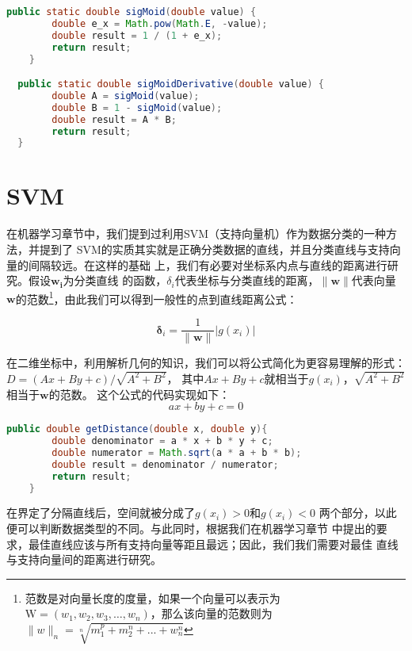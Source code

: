 \begin{lstlisting}[language=Java]
	public static double sigMoid(double value) {
		double e_x = Math.pow(Math.E, -value);
		double result = 1 / (1 + e_x);
		return result;
	}

  public static double sigMoidDerivative(double value) {
		double A = sigMoid(value);
		double B = 1 - sigMoid(value);
		double result = A * B;
		return result;
  }
\end{lstlisting}


\section{SVM}
在机器学习章节中，我们提到过利用SVM（支持向量机）作为数据分类的一种方法，并提到了
SVM的实质其实就是正确分类数据的直线，并且分类直线与支持向量的间隔较远。在这样的基础
上，我们有必要对坐标系内点与直线的距离进行研究。假设$\mathbf{w_{i}}$为分类直线
的函数，$\delta_{i}$代表坐标与分类直线的距离，$\mathbf{\|\mathbf{w}\|}$代表向量
$\mathbf{w}$的范数\footnote{范数是对向量长度的度量，如果一个向量可以表示为
$\mathrm{W}=(w_1, w_2, w_3, \ldots ,w_n)$，那么该向量的范数则为
$\|w\|_{n}=\sqrt[n]{m_{1}^{p}+m_{2}^{n}+...+w_{n}^{n}}$}，由此我们可以得到一般性的点到直线距离公式：

\begin{equation}
	\boldsymbol{\delta}_{i}=\frac{1}{\|\mathbf{w}\|}\left|g\left(x_{i}\right)\right|
\end{equation}

在二维坐标中，利用解析几何的知识，我们可以将公式简化为更容易理解的形式：
$D=(Ax+By+c) / \sqrt{A^{2}+B^{2}}$，
其中$Ax+By+c$就相当于$g(x_{i})$，$\sqrt{A^{2}+B^{2}}$相当于$\mathbf{w}$的范数。
这个公式的代码实现如下：
$$ ax + by + c = 0 $$

\begin{lstlisting}[language=Java]
	public double getDistance(double x, double y){
        double denominator = a * x + b * y + c;
        double numerator = Math.sqrt(a * a + b * b);
        double result = denominator / numerator;
        return result;
    }
\end{lstlisting}

在界定了分隔直线后，空间就被分成了$g(x_{i}) > 0$和$g(x_{i}) < 0$
两个部分，以此便可以判断数据类型的不同。与此同时，根据我们在机器学习章节
中提出的要求，最佳直线应该与所有支持向量等距且最远；因此，我们我们需要对最佳
直线与支持向量间的距离进行研究。

